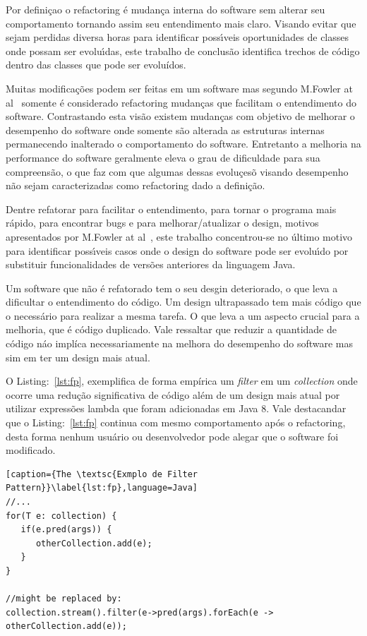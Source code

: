 Por definiçao o refactoring \'{e} mudan\c{c}a interna do software sem alterar seu comportamento tornando assim seu entendimento mais claro. Visando evitar que sejam perdidas diversa horas para identificar poss\'{\i}veis oportunidades de classes onde possam ser evolu\'{\i}das, este trabalho de conclus\~{a}o identifica trechos de c\'{o}digo dentro das classes que pode ser evolu\'{i}dos.

Muitas modifica\c{c}\~{o}es podem ser feitas em um software mas segundo M.Fowler at al~\cite{martinFowlerRafactoring} somente \'{e} considerado refactoring mudan\c{c}as que facilitam o entendimento do software. Contrastando esta vis\~{a}o existem mudanças com objetivo de melhorar o desempenho do software onde somente s\~{a}o alterada as estruturas internas permanecendo inalterado o comportamento do software. Entretanto a melhoria na performance do software geralmente eleva o grau de dificuldade para sua compreens\~{a}o, o que faz com que algumas dessas evolu\c{c}es\~{o} visando desempenho n\~{a}o sejam caracterizadas como refactoring dado a defini\c{c}\~{a}o.

Dentre refatorar para facilitar o entendimento, para tornar o programa mais r\'{a}pido, para encontrar bugs e para melhorar/atualizar o design, motivos apresentados por M.Fowler at al~\cite{martinFowlerRafactoring}, este trabalho concentrou-se no \'{u}ltimo motivo para identificar poss\'{\i}veis casos onde o design do software pode ser evolu\'{\i}do por substituir funcionalidades de vers\~{o}es anteriores da linguagem Java.

Um software que n\~{a}o \'{e} refatorado tem o seu desgin deteriorado, o que leva a dificultar o entendimento do c\'{o}digo. Um design ultrapassado tem mais c\'{o}digo que o necess\'{a}rio para realizar a mesma tarefa. O que leva a um aspecto crucial para a melhoria, que \'{e} código duplicado. Vale ressaltar que reduzir a quantidade de c\'{o}digo n\'{a}o impl\'{i}ca necessariamente na melhora do desempenho do software mas sim em ter um design mais atual.

O Listing:~\ref{lst:fp}, exemplifica de forma emp\'{i}rica um {\it filter} em um {\it collection} onde ocorre uma redu\c{c}\~{a}o significativa de c\'{o}digo al\'{e}m de um design mais atual por utilizar express\~{o}es lambda que foram adicionadas em Java 8. Vale destacandar que o Listing:~\ref{lst:fp} continua com mesmo comportamento após o refactoring, desta forma nenhum usuário ou desenvolvedor pode alegar que o software foi modificado.


\begin{lstlisting}[caption={The \textsc{Exmplo de Filter Pattern}}\label{lst:fp},language=Java] 
//...
for(T e: collection) {
   if(e.pred(args)) {
      otherCollection.add(e);
   }
}

//might be replaced by:
collection.stream().filter(e->pred(args).forEach(e -> otherCollection.add(e));
\end{lstlisting}


